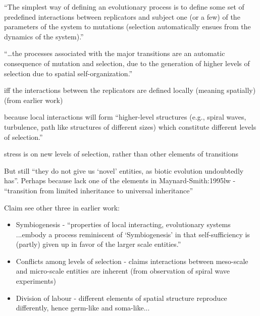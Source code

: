 \autocite{Hogeweg1998}

	``The simplest way of defining an evolutionary process is to define
	some set of predefined interactions between replicators and subject
	one (or a few) of the parameters of the system to mutations (selection
	automatically ensues from the dynamics of the system).''

	
	``\ldots{}the processes associated with the major transitions are an
	automatic consequence of mutation and selection, due to the generation
	of higher levels of selection due to spatial self-organization.''
	

		iff the interactions between the replicators are defined locally
		(meaning spatially) (from earlier work)
		

		because local interactions will form ``higher-level structures
		(e.g., spiral waves, turbulence, path like structures of different
		sizes) which constitute different levels of selection.''

		stress is on new levels of selection, rather than other elements of
		transitions

		
		But still ``they do not give us `novel' entities, as biotic
		evolution undoubtedly has''. Perhaps because lack one of the elements in Maynard-Smith:1995lw -
			``transition from limited inheritance to universal inheritance''
			

			Claim see other three in earlier work:
			
			\begin{itemize}
				\item
				
				Symbiogenesis - ``properties of local interacting, evolutionary
				systems ...embody a process reminiscent of `Symbiogenesis' in
				that self-sufficiency is (partly) given up in favor of the
				larger scale entities.''
				
				\item
				
				Conflicts among levels of selection - claims interactions
				between meso-scale and micro-scale entities are inherent (from
				observation of spiral wave experiments)
				
				\item
				
				Division of labour - different elements of spatial structure
				reproduce differently, hence germ-like and soma-like...
				
			\end{itemize}


